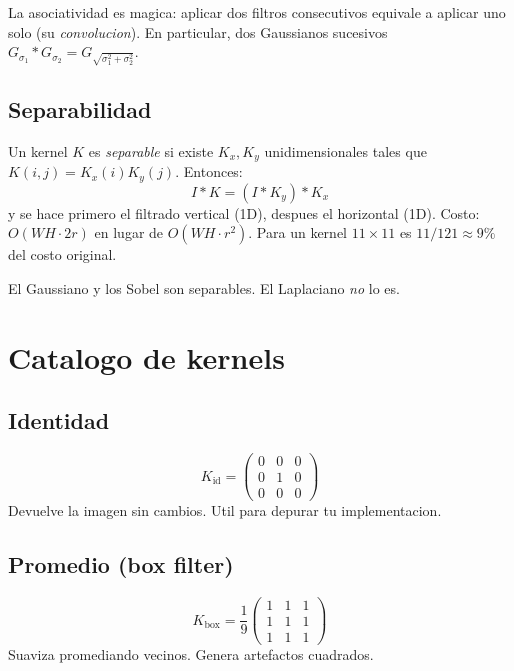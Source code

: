 \documentclass[11pt,a4paper,twoside,openright]{book}
\begin{document}
La asociatividad es magica: aplicar dos filtros consecutivos equivale a aplicar uno solo (su \emph{convolucion}). En particular, dos Gaussianos sucesivos $G_{\sigma_1} * G_{\sigma_2} = G_{\sqrt{\sigma_1^2+\sigma_2^2}}$.

\subsection{Separabilidad}

Un kernel $K$ es \emph{separable} si existe $K_x, K_y$ unidimensionales tales que $K(i,j) = K_x(i) K_y(j)$. Entonces:
\begin{equation}
I * K = (I * K_y) * K_x
\end{equation}
y se hace primero el filtrado vertical (1D), despues el horizontal (1D). Costo: $O(WH \cdot 2r)$ en lugar de $O(WH \cdot r^2)$. Para un kernel $11{\times}11$ es $11/121 \approx 9\%$ del costo original.

El Gaussiano y los Sobel son separables. El Laplaciano \emph{no} lo es.

\section{Catalogo de kernels}

\subsection{Identidad}
\begin{equation}
K_{\text{id}} = \begin{pmatrix} 0 & 0 & 0 \\ 0 & 1 & 0 \\ 0 & 0 & 0 \end{pmatrix}
\end{equation}
Devuelve la imagen sin cambios. Util para depurar tu implementacion.

\subsection{Promedio (box filter)}
\begin{equation}
K_{\text{box}} = \frac{1}{9}\begin{pmatrix} 1 & 1 & 1 \\ 1 & 1 & 1 \\ 1 & 1 & 1 \end{pmatrix}
\end{equation}
Suaviza promediando vecinos. Genera artefactos cuadrados.
\end{document}
